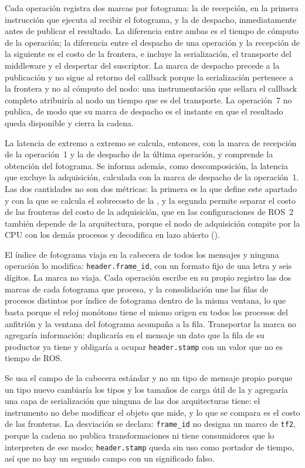 Cada operación registra dos marcas por fotograma: la de recepción, en la
primera instrucción que ejecuta al recibir el fotograma, y la de despacho,
inmediatamente antes de publicar el resultado. La diferencia entre ambas es
el tiempo de cómputo de la operación; la diferencia entre el despacho de una
operación y la recepción de la siguiente es el costo de la frontera, e
incluye la serialización, el transporte del middleware y el despertar del
suscriptor. La marca de despacho precede a la publicación y no sigue al
retorno del callback porque la serialización pertenece a la frontera y no al
cómputo del nodo: una instrumentación que sellara el callback completo
atribuiría al nodo un tiempo que es del transporte. La operación~7 no publica,
de modo que su marca de despacho es el instante en que el resultado queda
disponible y cierra la cadena.

La latencia de extremo a extremo se calcula, entonces, con la marca de
recepción de la operación~1 y la de despacho de la última operación, y
comprende la obtención del fotograma. Se informa además, como descomposición,
la latencia que excluye la adquisición, calculada con la marca de despacho de
la operación~1. Las dos cantidades no son dos métricas: la primera es la que
define este apartado y con la que se calcula el sobrecosto de la
, y la segunda permite separar el costo de las fronteras
del costo de la adquisición, que en las configuraciones de ROS~2 también
depende de la arquitectura, porque el nodo de adquisición compite por la CPU
con los demás procesos y decodifica en lazo abierto
().

El índice de fotograma viaja en la cabecera de todos los mensajes y ninguna
operación lo modifica: \texttt{header.frame\_id}, con un formato fijo de una
letra y seis dígitos. La marca no viaja. Cada operación escribe en su propio
registro las dos marcas de cada fotograma que procesa, y la consolidación une
las filas de procesos distintos por índice de fotograma dentro de la misma
ventana, lo que basta porque el reloj monótono tiene el mismo origen en todos
los procesos del anfitrión y la ventana del fotograma acompaña a la fila.
Transportar la marca no agregaría información: duplicaría en el mensaje un
dato que la fila de su productor ya tiene y obligaría a ocupar
\texttt{header.stamp} con un valor que no es tiempo de ROS.

Se usa el campo de la cabecera estándar y no un tipo de mensaje propio porque
un tipo nuevo cambiaría los tipos y los tamaños de carga útil de la
 y agregaría una capa de serialización que ninguna de las
dos arquitecturas tiene: el instrumento no debe modificar el objeto que mide,
y lo que se compara es el costo de las fronteras. La desviación se declara:
\texttt{frame\_id} no designa un marco de \texttt{tf2}, porque la cadena no
publica transformaciones ni tiene consumidores que lo interpreten de ese modo;
\texttt{header.stamp} queda sin uso como portador de tiempo, así que no hay un
segundo campo con un significado falso.

